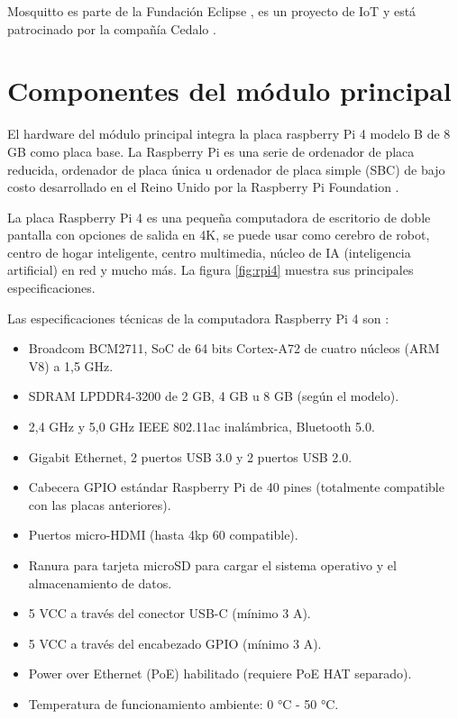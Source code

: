 Mosquitto es parte de la Fundación Eclipse \citep{WEBSITE:5}, es un proyecto de IoT \citep{WEBSITE:39} y está patrocinado por la compañía Cedalo \citep{WEBSITE:40}. 

\section{Componentes del módulo principal} 

El hardware del módulo principal integra la placa raspberry Pi 4 modelo B de 8 GB como placa base. La Raspberry Pi es una serie de ordenador de placa reducida, ordenador de placa única u ordenador de placa simple (SBC) de bajo costo desarrollado en el Reino Unido por la Raspberry Pi Foundation \citep{WEBSITE:6}.

La placa Raspberry Pi 4 es una pequeña computadora de escritorio de doble pantalla con opciones de salida en 4K, se puede usar como cerebro de robot, centro de hogar inteligente, centro multimedia, núcleo de IA (inteligencia artificial) en red y mucho más. La figura \ref{fig:rpi4} muestra sus principales especificaciones.

Las especificaciones técnicas de la computadora Raspberry Pi 4 son \citep{WEBSITE:7}:

\begin{itemize}
\item Broadcom BCM2711, SoC de 64 bits Cortex-A72 de cuatro núcleos (ARM V8) a 1,5 GHz.
\item SDRAM LPDDR4-3200 de 2 GB, 4 GB u 8 GB (según el modelo).
\item 2,4 GHz y 5,0 GHz IEEE 802.11ac inalámbrica, Bluetooth 5.0.
\item Gigabit Ethernet, 2 puertos USB 3.0 y 2 puertos USB 2.0.
\item Cabecera GPIO estándar Raspberry Pi de 40 pines (totalmente compatible con las placas anteriores).
\item Puertos micro-HDMI (hasta 4kp 60 compatible).
\item Ranura para tarjeta microSD para cargar el sistema operativo y el almacenamiento de datos.
\item 5 VCC a través del conector USB-C (mínimo 3 A).
\item 5 VCC a través del encabezado GPIO (mínimo 3 A).
\item Power over Ethernet (PoE) habilitado (requiere PoE HAT separado).
\item Temperatura de funcionamiento ambiente: 0 °C - 50 °C.
\end{itemize}

